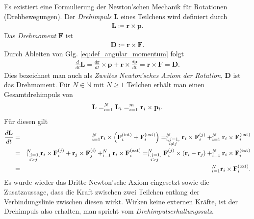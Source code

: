 \documentclass{book}
\let\sum\relax
\DeclareMathOperator*{\sum}{\raisebox{-3.5pt}{\scalebox{2}{\rotatebox{1}{{\bask Σ}}}}}
\begin{document}
Es existiert eine Formulierung der Newton'schen Mechanik für Rotationen (Drehbewegungen). Der \textit{Drehimpuls} $\mathbf{L}$ eines Teilchens wird definiert durch
%
\begin{eqnarray}
\mathbf{L} \coloneqq \mathbf{r}\times\mathbf{p}.\label{eq:def_angular_momentum}
\end{eqnarray}
%
Das \textit{Drehmoment} $\mathbf{F}$ ist
%
\begin{eqnarray}
\mathbf{D} \coloneqq \mathbf{r}\times\mathbf{F}.
\end{eqnarray}
%
Durch Ableiten von Glg. \eqref{eq:def_angular_momentum} folgt
%
\begin{eqnarray}
\frac{d}{dt}\mathbf{L} = \frac{d\mathbf{r}}{dt}\times\mathbf{p} + \mathbf{r}\times\frac{d\mathbf{p}}{dt} = \mathbf{r}\times\mathbf{F} = \mathbf{D}.
\end{eqnarray}
%
Dies bezeichnet man auch als \textit{Zweites Newton'sches Axiom der Rotation}, $\mathbf{D}$ ist das Drehmoment. Für $N\in\mathbb{N}$ mit $N\geq 1$ Teilchen erhält man einen Gesamtdrehimpuls von
%
\begin{eqnarray}
\mathbf{L} = \sum_{i = 1}^{N}\mathbf{L}_i = \sum_{i = 1}^{m}\mathbf{r}_i\times\mathbf{p}_i.
\end{eqnarray}
%
Für diesen gilt
%
\begin{eqnarray}
\frac{d\mathbf{L}}{dt} & = & \sum_{i = 1}^{N}\mathbf{r}_i\times\left(\mathbf{F}_i^{\text{(int)}} + \mathbf{F}_i^{\text{(ext)}}\right) = \sum_{\substack{i, j = 1,\\i\not = j}}^{N}\mathbf{r}_i\times\mathbf{F}_i^{(j)} + \sum_{i = 1}^{N}\mathbf{r}_i\times\mathbf{F}_i^{\text{(ext)}}\nonumber\\
& = & \sum_{\substack{i, j = 1,\\i>j}}^{N}\mathbf{r}_i\times\mathbf{F}_i^{(j)} + \mathbf{r}_j\times\mathbf{F}_j^{(i)} + \sum_{i = 1}^{N}\mathbf{r}_i\times\mathbf{F}_i^{\text{(ext)}} = \sum_{\substack{i, j = 1,\\i>j}}^{N}\mathbf{F}_i^{(j)}\times\left(\mathbf{r}_i - \mathbf{r}_j\right) + \sum_{i = 1}^{N}\mathbf{r}_i\times\mathbf{F}_i^{\text{(ext)}}\nonumber\\
& = & \sum_{i = 1}^{N}\mathbf{r}_i\times\mathbf{F}_i^{\text{(ext)}}.
\end{eqnarray}
%
Es wurde wieder das Dritte Newton'sche Axiom eingesetzt sowie die Zusatzaussage, dass die Kraft zwischen zwei Teilchen entlang der Verbindungslinie zwischen diesen wirkt. Wirken keine externen Kräfte, ist der Drehimpuls also erhalten, man spricht vom \textit{Drehimpulserhaltungssatz}.
\end{document}
